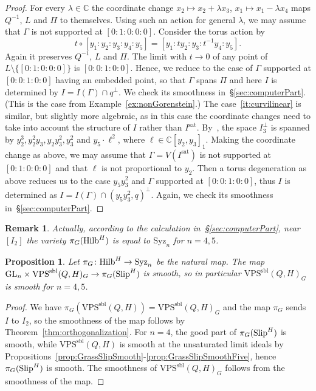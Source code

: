 \documentclass{amsart}
\newcommand{\Hilb}{{\rm{Hilb}}}
\newcommand{\Slip}{{\rm{Slip}}}
\newcommand{\CC}{{\mathbb C}}
\newcommand{\VPSsbl}{{\mathrm{VPS}}^{\mathrm{sbl}}(Q, H)}
\newcommand{\Syz}{\mathrm{Syz}_n}%
\newcommand{\GL}{\mathrm{GL}}%
\newcommand{\sat}{\mathrm{sat}}%
\newtheorem{proposition}[lemma]{\bf Proposition}
\newtheorem{remark}[lemma]{\bf Remark}
\begin{document}
\begin{proof}
    For every $\lambda\in \CC$ the
    coordinate change $x_2\mapsto x_2 + \lambda x_3$, $x_1 \mapsto x_1 - \lambda
    x_4$ maps $Q^{-1}$, $L$ and $\Pi$ to themselves.
    Using such an action for general $\lambda$, we may assume that $\Gamma$ is
    not supported at $[0:1:0:0:0]$.
    Consider the torus action by
    \[
        t\circ[y_1:y_2:y_3:y_4:y_5] = [y_1:ty_2:y_3:t^{-1}y_4:y_5].
    \]
    Again it preserves $Q^{-1}$, $L$ and $\Pi$. The limit with $t\to 0$ of any
    point of $L \setminus \{[0:1:0:0:0]\}$ is $[0:0:1:0:0]$. Hence, we reduce
    to the case of $\Gamma$ supported at $[0:0:1:0:0]$ having an embedded
    point, so that $\Gamma$ spans $\Pi$ and here $I$ is determined by $I =
    I(\Gamma) \cap q^{\perp}$. We check its smoothness
    in~\S\ref{sec:computerPart}. (This is the case from
    Example~\ref{ex:nonGorenstein}.)
    The case~\ref{it:curvilinear} is similar, but slightly more algebraic,
    as in this case the coordinate changes need to take into account the
    structure of $I$ rather than $I^{\sat}$. By~\cite[Proposition~4.4(3)]{JM},
    the space $I^{\perp}_3$ is spanned by $y_2^3, y_2^2y_3, y_2y_3^2, y_3^2$
    and $y_5\cdot \ell^2$, where $\ell\in \CC[y_2, y_3]_1$.
    Making the coordinate change as above, we may assume that $\Gamma =
    V(I^{\sat})$ is not supported at $[0:1:0:0:0]$ and that $\ell$ is not
    proportional to $y_2$. Then a torus degeneration as above reduces us to
    the case $y_5y_3^2$ and $\Gamma$ supported at $[0:0:1:0:0]$, thus $I$ is
    determined as $I = I(\Gamma) \cap (y_5y_3^2, q)^{\perp}$. Again, we check its smoothness
    in~\S\ref{sec:computerPart}.
\end{proof}


\begin{remark}
    Actually, according to the calculation in~\S\ref{sec:computerPart}, near
    $[I_2]$ the variety $\pi_G(\Hilb^H)$ is equal to $\Syz$ for $n=4,5$.
\end{remark}

\begin{proposition}\label{G-smooth}
    Let $\pi_G\colon \Hilb^H\to \Syz$ be the natural map.
    The map $\GL_n\times \VPSsbl_G\to \pi_G(\Slip^H)$ is smooth, so in
    particular $\VPSsbl_G$ is smooth for $n=4, 5$.
\end{proposition}
\begin{proof}
    We have $\pi_G(\VPSsbl) = \VPSsbl_G$ and the map $\pi_G$ sends $I$ to $I_2$,
    so the smoothness of the map follows by
    Theorem~\ref{thm:orthogonalization}.  For $n=4$, the good part of $\pi_G(\Slip^H)$ is
    smooth, while $\VPSsbl$ is smooth at the unsaturated limit ideals by
    Propositions~\ref{prop:GrassSlipSmooth}-\ref{prop:GrassSlipSmoothFive}, hence $\pi_G(\Slip^H)$ is smooth.
    The smoothness of $\VPSsbl_G$ follows from the smoothness of the map.
\end{proof}
\end{document}
